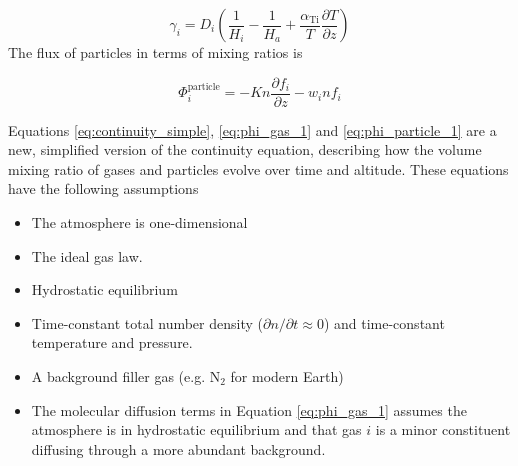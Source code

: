 \documentclass{article}
\begin{document}
\begin{equation}
  \gamma_{i} = D_{i}\left( \frac{1}{H_{i}} - \frac{1}{H_{a}} + \frac{\alpha_{\text{Ti}}}{T}\frac{\partial T}{\partial z} \right)
\end{equation}
The flux of particles in terms of mixing ratios is

\begin{equation} \label{eq:phi_particle_1}
  \boxed{\Phi_{i}^\text{particle} = - Kn\frac{\partial f_{i}}{\partial z} - w_i n f_{i}}
\end{equation}

Equations \eqref{eq:continuity_simple}, \eqref{eq:phi_gas_1} and \eqref{eq:phi_particle_1} are a new, simplified version of the continuity equation, describing how the volume mixing ratio of gases and particles evolve over time and altitude. These equations have the following assumptions
\begin{itemize}
  \item The atmosphere is one-dimensional
  \item The ideal gas law.
  \item Hydrostatic equilibrium
  \item Time-constant total number density ($\partial n / \partial t \approx 0$) and time-constant temperature and pressure.
  \item A background filler gas (e.g. N$_2$ for modern Earth)
  \item The molecular diffusion terms in Equation \eqref{eq:phi_gas_1} assumes the atmosphere is in hydrostatic equilibrium and that gas $i$ is a minor constituent diffusing through a more abundant background.
\end{itemize}

\end{document}
